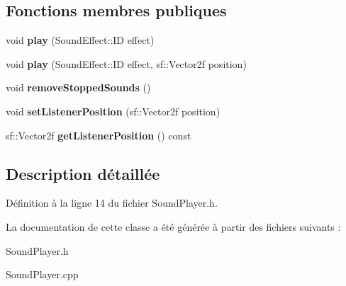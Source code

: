 \subsection*{Fonctions membres publiques}
\begin{DoxyCompactItemize}
\item 
\hypertarget{class_sound_player_aa0b85f15f5b13bc41c71eeee6b0a7779}{}\label{class_sound_player_aa0b85f15f5b13bc41c71eeee6b0a7779} 
void {\bfseries play} (Sound\+Effect\+::\+ID effect)
\item 
\hypertarget{class_sound_player_af05ab9267e732246b2488d7a572bc58c}{}\label{class_sound_player_af05ab9267e732246b2488d7a572bc58c} 
void {\bfseries play} (Sound\+Effect\+::\+ID effect, sf\+::\+Vector2f position)
\item 
\hypertarget{class_sound_player_a3fd165dadf60b580b16367b81d84681b}{}\label{class_sound_player_a3fd165dadf60b580b16367b81d84681b} 
void {\bfseries remove\+Stopped\+Sounds} ()
\item 
\hypertarget{class_sound_player_abfd270417c9490f1c0f92b0c4986fa52}{}\label{class_sound_player_abfd270417c9490f1c0f92b0c4986fa52} 
void {\bfseries set\+Listener\+Position} (sf\+::\+Vector2f position)
\item 
\hypertarget{class_sound_player_a26ace9198bf0324da5df1b2919ce9665}{}\label{class_sound_player_a26ace9198bf0324da5df1b2919ce9665} 
sf\+::\+Vector2f {\bfseries get\+Listener\+Position} () const
\end{DoxyCompactItemize}


\subsection{Description détaillée}


Définition à la ligne 14 du fichier Sound\+Player.\+h.



La documentation de cette classe a été générée à partir des fichiers suivants \+:\begin{DoxyCompactItemize}
\item 
Sound\+Player.\+h\item 
Sound\+Player.\+cpp\end{DoxyCompactItemize}
